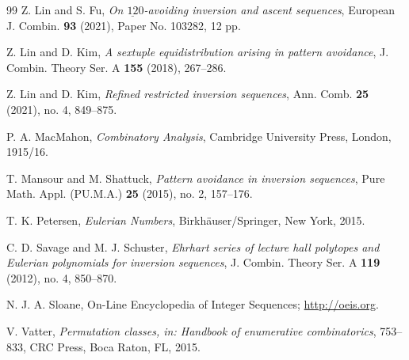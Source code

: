 \documentclass[reqno]{amsart}
\numberwithin{equation}{section}
\theoremstyle{plain}
\theoremstyle{definition}
\theoremstyle{named}
\begin{document}
\begin{thebibliography}{99}
	{\sc Z. Lin and S. Fu}, {\em On $\underline{12}0$-avoiding inversion and ascent sequences}, European J. Combin. {\bf93} (2021), Paper No. 103282, 12 pp.
	
	{\sc Z. Lin and D. Kim}, {\em A sextuple equidistribution arising in pattern avoidance}, J. Combin. Theory Ser. A {\bf155} (2018), 267--286.
	
	{\sc Z. Lin and D. Kim}, {\em Refined restricted inversion sequences}, Ann. Comb. {\bf25} (2021), no. 4, 849--875.
	
	{\sc P. A. MacMahon}, {\em Combinatory Analysis}, Cambridge University Press, London, 1915/16.
	
	{\sc T. Mansour and M. Shattuck}, {\em Pattern avoidance in inversion sequences}, Pure Math. Appl. (PU.M.A.) {\bf25} (2015), no. 2, 157--176.
	
	{\sc T. K. Petersen}, {\em Eulerian Numbers}, Birkhäuser/Springer, New York, 2015.
	
	{\sc C. D. Savage and M. J. Schuster},
	{\em Ehrhart series of lecture hall polytopes and Eulerian polynomials for inversion sequences}, J. Combin. Theory Ser. A {\bf119} (2012), no. 4, 850--870.
	
	{\sc N. J. A. Sloane}, On-Line Encyclopedia of Integer Sequences; \url{http://oeis.org}.
	
	{\sc V. Vatter}, {\em Permutation classes, in: Handbook of enumerative combinatorics}, 753--833, CRC Press, Boca Raton, FL, 2015.

\end{thebibliography}
\end{document}
